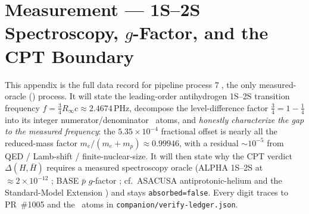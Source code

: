 \section{Measurement --- 1S--2S Spectroscopy, $g$-Factor, and the CPT Boundary}
\label{app:measurement}

This appendix is the full data record for pipeline process
\textcircled{\scriptsize 7}, the only measured-oracle (\tierOrange) process.
It will state the leading-order antihydrogen 1S--2S transition frequency
$f=\tfrac34 R_\infty c\approx2.4674$\,PHz, decompose the level-difference
factor $\tfrac34=1-\tfrac14$ into its integer numerator/denominator
\tierBlue\ atoms, and \emph{honestly characterize the gap to the measured
frequency}: the $5.35\!\times\!10^{-4}$ fractional offset is nearly all the
reduced-mass factor $m_e/(m_e+m_p)\approx0.99946$, with a residual
$\sim\!10^{-5}$ from QED / Lamb-shift / finite-nuclear-size. It will then
state why the CPT verdict $\Delta(H,\bar H)$ requires a measured spectroscopy
oracle (ALPHA 1S--2S at $\approx\!2\!\times\!10^{-12}$
\citep{ahmadi2018alpha1s2s}; BASE $\bar p$ $g$-factor
\citep{smorra2017base}; cf.\ ASACUSA antiprotonic-helium
\citep{hori2013asacusa} and the Standard-Model Extension
\citep{kostelecky2011lorentz}) and stays \texttt{absorbed=false}. Every digit
traces to PR~\#1005 and the \tierGreen\ atoms in
\texttt{companion/verify-ledger.json}.

